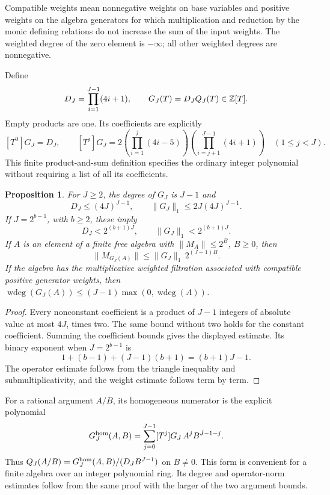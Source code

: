 \documentclass[11pt,a4paper]{article}
\newtheorem{proposition}[theorem]{Proposition}
\theoremstyle{definition}\newtheorem{definition}[theorem]{Definition}
\begin{document}
Compatible weights mean nonnegative weights on base variables and
positive weights on the algebra generators for which multiplication
and reduction by the monic defining relations do not increase the
sum of the input weights. The weighted degree of the zero element is
$-\infty$; all other weighted degrees are nonnegative.

Define
\[
 D_J=\prod_{i=1}^{J-1}(4i+1),\qquad
 G_J(T)=D_J Q_J(T)\in\mathbb Z[T].
\]
Empty products are one. Its coefficients are explicitly
\[
 [T^0]G_J=D_J,\qquad
 [T^j]G_J=
 2\left(\prod_{i=1}^{j}(4i-5)\right)
  \left(\prod_{i=j+1}^{J-1}(4i+1)\right)
 \quad(1\le j<J).
\]
This finite product-and-sum definition specifies the ordinary integer
polynomial without requiring a list of all its coefficients.

\begin{proposition}\label{prop:indexed-logarithm-coefficients}
For $J\ge2$, the degree of $G_J$ is $J-1$ and
\[
 D_J\le(4J)^{J-1},\qquad
              \|G_J\|_1\le2J(4J)^{J-1}.
\]
If $J=2^{b-1}$, with $b\ge2$, these imply
\[
                    D_J<2^{(b+1)J},\qquad
                    \|G_J\|_1<2^{(b+1)J}.
\]
If $A$ is an element of a finite free algebra with
$\|M_A\|\le2^B$, $B\ge0$, then
\[
                  \|M_{G_J(A)}\|
                  \le\|G_J\|_1\,2^{(J-1)B}.
\]
If the algebra has the multiplicative weighted filtration associated
with compatible positive generator weights, then
$\operatorname{wdeg}(G_J(A))\le(J-1)\max(0,\operatorname{wdeg}(A))$.
\end{proposition}
\begin{proof}
Every nonconstant coefficient is a product of $J-1$ integers of
absolute value at most $4J$, times two. The same bound without two
holds for the constant coefficient. Summing the coefficient bounds
gives the displayed estimate. Its binary exponent when
$J=2^{b-1}$ is
\[
       1+(b-1)+(J-1)(b+1)=(b+1)J-1.
\]
The operator estimate follows from the triangle inequality and
submultiplicativity, and the weight estimate follows term by term.
\end{proof}

For a rational argument $A/B$, its homogeneous numerator is the
explicit polynomial
\[
 G_J^{\rm hom}(A,B)=\sum_{j=0}^{J-1}[T^j]G_J\,A^jB^{J-1-j}.
\]
Thus $Q_J(A/B)=G_J^{\rm hom}(A,B)/(D_JB^{J-1})$ on $B\ne0$.
This form is convenient for a finite algebra over an integer polynomial
ring. Its degree and operator-norm estimates follow from the same
proof with the larger of the two argument bounds.
\end{document}
